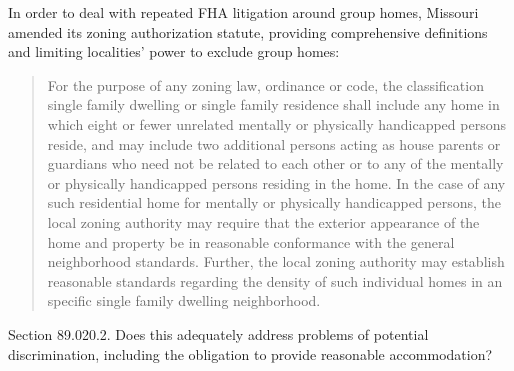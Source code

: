 In order to deal with repeated FHA litigation around group homes, Missouri
amended its zoning authorization statute, providing comprehensive definitions
and limiting localities' power to exclude group homes: 
\begin{quote}
For the purpose of any zoning law, ordinance or code, the classification single
family dwelling or single family residence shall include any home in which eight
or fewer unrelated mentally or physically handicapped persons reside, and may
include two additional persons acting as house parents or guardians who need not
be related to each other or to any of the mentally or physically handicapped
persons residing in the home. In the case of any such residential home for
mentally or physically handicapped persons, the local zoning authority may
require that the exterior appearance of the home and property be in reasonable
conformance with the general neighborhood standards. Further, the local zoning
authority may establish reasonable standards regarding the density of such
individual homes in an specific single family dwelling neighborhood.
\end{quote}
Section 89.020.2. Does this adequately address problems of potential
discrimination, including the obligation to provide reasonable accommodation? 

